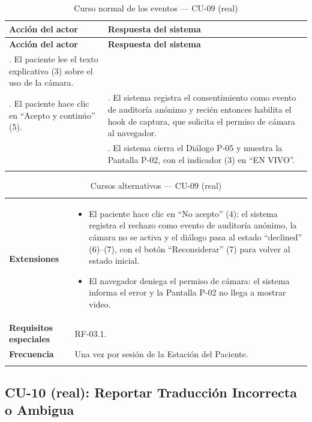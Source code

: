 \setlength{\extrarowheight}{5pt}
\begin{longtable}{@{}>{\raggedright\arraybackslash}p{} >{\raggedright\arraybackslash}p{}@{}}
\toprule
\textbf{Acción del actor} & \textbf{Respuesta del sistema} \\
\midrule
\endfirsthead
\toprule
\textbf{Acción del actor} & \textbf{Respuesta del sistema} \\
\midrule
\endhead
1. El paciente lee el texto explicativo (3) sobre el uso de la cámara. & \\
2. El paciente hace clic en ``Acepto y continúo'' (5). &
3. El sistema registra el consentimiento como evento de auditoría
anónimo y recién entonces habilita el hook de captura, que solicita el
permiso de cámara al navegador. \\
&
4. El sistema cierra el Diálogo P-05 y muestra la Pantalla P-02, con el
indicador (3) en ``EN VIVO''. \\
\bottomrule
\caption{Curso normal de los eventos --- CU-09 (real)}
\end{longtable}
\setlength{\extrarowheight}{0pt}

\begin{longtable}{@{}p{4.1cm} >{\raggedright\arraybackslash}p{11.2cm}@{}}
\toprule
\textbf{Extensiones} &
\begin{itemize}[leftmargin=*, itemsep=2pt]
    \item[2a.] El paciente hace clic en ``No acepto'' (4): el sistema
    registra el rechazo como evento de auditoría anónimo, la cámara no
    se activa y el diálogo pasa al estado ``declined'' (6)--(7), con el
    botón ``Reconsiderar'' (7) para volver al estado inicial.
    \item[3a.] El navegador deniega el permiso de cámara: el sistema
    informa el error y la Pantalla P-02 no llega a mostrar video.
\end{itemize} \\
\textbf{Requisitos especiales} & RF-03.1. \\
\textbf{Frecuencia} & Una vez por sesión de la Estación del Paciente. \\
\bottomrule
\caption{Cursos alternativos --- CU-09 (real)}
\end{longtable}

\subsection{CU-10 (real): Reportar Traducción Incorrecta o Ambigua}

